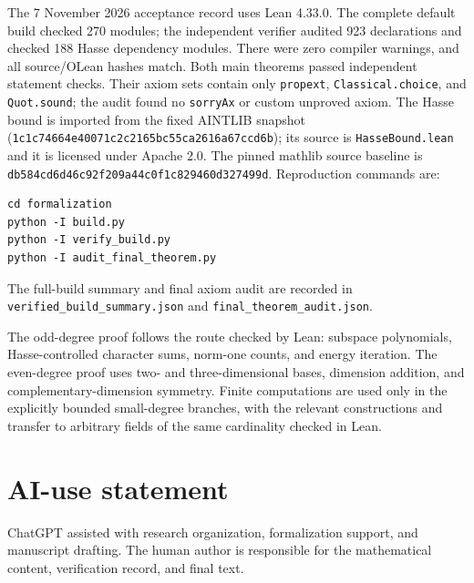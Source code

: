 \documentclass[11pt]{amsart}
\numberwithin{equation}{section}
\theoremstyle{definition}
\theoremstyle{remark}
\begin{document}
{\raggedright
The 7 November 2026 acceptance record uses Lean 4.33.0. The complete default build checked 270 modules; the independent verifier audited 923 declarations and checked 188 Hasse dependency modules. There were zero compiler warnings, and all source/OLean hashes match.
Both main theorems passed independent statement checks. Their axiom sets contain only \texttt{propext}, \texttt{Classical.choice}, and \texttt{Quot.sound}; the audit found no \texttt{sorryAx} or custom unproved axiom.
The Hasse bound is imported from the fixed AINTLIB snapshot~\cite{AINTLIB} (\texttt{1c1c7466\allowbreak 4e40071c\allowbreak 2c2165bc\allowbreak 55ca2616\allowbreak a67ccd6b}); its source is \texttt{HasseBound.lean} and it is licensed under Apache 2.0.
The pinned mathlib source baseline is \texttt{db584cd6\allowbreak d46c92f2\allowbreak 09a44c0f\allowbreak 1c829460\allowbreak d327499d}. Reproduction commands are:
\par}
\begin{verbatim}
cd formalization
python -I build.py
python -I verify_build.py
python -I audit_final_theorem.py
\end{verbatim}
The full-build summary and final axiom audit are recorded in \texttt{verified\_build\_summary.json} and \texttt{final\_theorem\_audit.json}.

The odd-degree proof follows the route checked by Lean: subspace polynomials, Hasse-controlled character sums, norm-one counts, and energy iteration. The even-degree proof uses two- and three-dimensional bases, dimension addition, and complementary-dimension symmetry. Finite computations are used only in the explicitly bounded small-degree branches, with the relevant constructions and transfer to arbitrary fields of the same cardinality checked in Lean.

\section*{AI-use statement}
ChatGPT assisted with research organization, formalization support, and manuscript drafting. The human author is responsible for the mathematical content, verification record, and final text.
\end{document}
